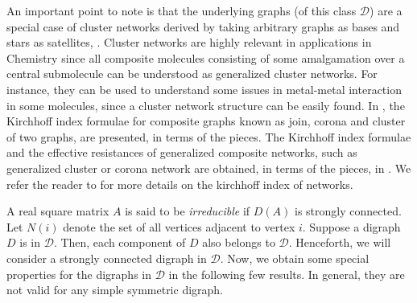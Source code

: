 \documentclass[notitlepage,12pt,reqno]{amsart}
\numberwithin{equation}{section}
\begin{document}
An important point to note is that the underlying graphs (of this class $\mathcal{D}$) are a special case of cluster networks derived by taking arbitrary graphs as bases and stars as satellites, \cite{ca,zhang}. Cluster networks are highly relevant in applications in Chemistry since all composite molecules consisting of some amalgamation over a central submolecule can be understood as generalized cluster networks. For instance, they can be used to understand some issues in metal-metal interaction in some molecules, since a cluster network structure can be easily found. In \cite{zhang}, the Kirchhoff index formulae for composite graphs known as join, corona and cluster of two graphs, are presented, in terms of the pieces. The Kirchhoff index formulae and the effective resistances of generalized composite networks, such as generalized cluster or corona network are obtained, in terms of the pieces, in \cite{ca}. We refer the reader to \cite{ac,bendito} for more details on the kirchhoff index of networks.

A real square matrix $A$ is said to be {\it irreducible} if $D(A)$ is strongly connected. Let $N(i)$ denote the set of all vertices adjacent to vertex $i$. Suppose a digraph $D$ is in $\mathcal{D}$. Then, each component of $D$ also belongs to $\mathcal{D}$. Henceforth, we will consider a strongly connected digraph in $\mathcal{D}$. Now, we obtain some special properties for the digraphs in $\mathcal{D}$ in the following few results. In general, they are not valid for any simple symmetric digraph.
\end{document}
